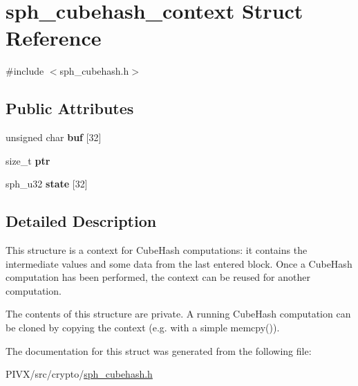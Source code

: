 \hypertarget{structsph__cubehash__context}{}\section{sph\+\_\+cubehash\+\_\+context Struct Reference}
\label{structsph__cubehash__context}


{\ttfamily \#include $<$sph\+\_\+cubehash.\+h$>$}

\subsection*{Public Attributes}
\begin{DoxyCompactItemize}
\item 
\mbox{\label{structsph__cubehash__context_a2d988768ff925b9ad52a68c84b87fc53}} 
unsigned char {\bfseries buf} \mbox{[}32\mbox{]}
\item 
\mbox{\label{structsph__cubehash__context_adbd480e1bc0f3adff4b7558c78929980}} 
size\+\_\+t {\bfseries ptr}
\item 
\mbox{\label{structsph__cubehash__context_a5355951521097d9835aae88d335674c9}} 
sph\+\_\+u32 {\bfseries state} \mbox{[}32\mbox{]}
\end{DoxyCompactItemize}


\subsection{Detailed Description}
This structure is a context for Cube\+Hash computations\+: it contains the intermediate values and some data from the last entered block. Once a Cube\+Hash computation has been performed, the context can be reused for another computation.

The contents of this structure are private. A running Cube\+Hash computation can be cloned by copying the context (e.\+g. with a simple {\ttfamily memcpy()}). 

The documentation for this struct was generated from the following file\+:\begin{DoxyCompactItemize}
\item 
P\+I\+V\+X/src/crypto/\mbox{\hyperlink{sph__cubehash_8h}{sph\+\_\+cubehash.\+h}}\end{DoxyCompactItemize}
